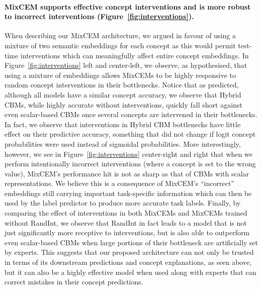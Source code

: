 \documentclass[withindex,glossary]{cam-thesis}
\theoremstyle{plain}
\theoremstyle{definition}
\theoremstyle{remark}
\begin{document}
\paragraph{MixCEM supports effective concept interventions and is more robust to incorrect interventions (Figure~\ref{fig:interventions}).} When describing our MixCEM architecture, we argued in favour of using a mixture of two semantic embeddings for each concept as this would permit test-time interventions which can meaningfully affect entire concept embeddings. In Figure~\ref{fig:interventions} left and center-left, we observe, as hypothesised, that using a mixture of embeddings allows MixCEMs to be highly responsive to random concept interventions in their bottlenecks. Notice that as predicted, although all models have a similar concept accuracy, we observe that Hybrid CBMs, while highly accurate without interventions, quickly fall short against even scalar-based CBMs once several concepts are intervened in their bottlenecks. In fact, we observe that interventions in Hybrid CBM bottlenecks have little effect on their predictive accuracy, something that did not change if logit concept probabilities were used instead of sigmoidal probabilities. More interestingly, however, we see in Figure~\ref{fig:interventions} center-right and right that when we perform intentionally incorrect interventions (where a concept is set to the wrong value), MixCEM's performance hit is not as sharp as that of CBMs with scalar representations. We believe this is a consequence of MixCEM's ``incorrect'' embeddings still carrying important task-specific information which can then be used by the label predictor to produce more accurate task labels. Finally, by comparing the effect of interventions in both MixCEMs and MixCEMs trained without RandInt, we observe that RandInt in fact leads to a model that is not just significantly more receptive to interventions, but is also able to outperform even scalar-based CBMs when large portions of their bottleneck are artificially set by experts. This suggests that our proposed architecture can not only be trusted in terms of its downstream predictions and concept explanations, as seen above, but it can also be a highly effective model when used along with experts that can correct mistakes in their concept predictions.

\end{document}
